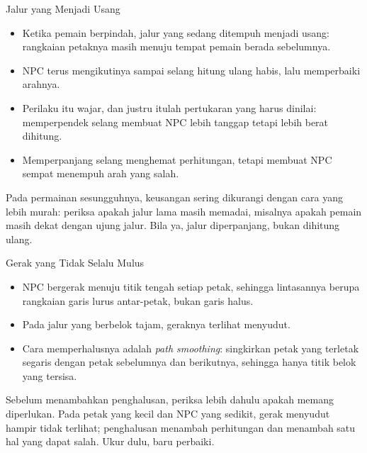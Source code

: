 \documentclass[aspectratio=169,10pt]{beamer}
\begin{document}
\begin{frame}{Jalur yang Menjadi Usang}
\begin{itemize}
  \item Ketika pemain berpindah, jalur yang sedang ditempuh menjadi usang:
        rangkaian petaknya masih menuju tempat pemain berada sebelumnya.
  \item NPC terus mengikutinya sampai selang hitung ulang habis, lalu
        memperbaiki arahnya.
  \item Perilaku itu wajar, dan justru itulah pertukaran yang harus dinilai:
        memperpendek selang membuat NPC lebih tanggap tetapi lebih berat
        dihitung.
  \item Memperpanjang selang menghemat perhitungan, tetapi membuat NPC sempat
        menempuh arah yang salah.
\end{itemize}
\vspace{0.1cm}
\begin{kotak}
Pada permainan sesungguhnya, keusangan sering dikurangi dengan cara yang lebih
murah: periksa apakah jalur lama masih memadai, misalnya apakah pemain masih
dekat dengan ujung jalur. Bila ya, jalur diperpanjang, bukan dihitung ulang.
\end{kotak}
\end{frame}

\begin{frame}{Gerak yang Tidak Selalu Mulus}
\begin{itemize}
  \item NPC bergerak menuju titik tengah setiap petak, sehingga lintasannya
        berupa rangkaian garis lurus antar-petak, bukan garis halus.
  \item Pada jalur yang berbelok tajam, geraknya terlihat menyudut.
  \item Cara memperhalusnya adalah \emph{path smoothing}: singkirkan petak yang
        terletak segaris dengan petak sebelumnya dan berikutnya, sehingga hanya
        titik belok yang tersisa.
\end{itemize}
\vspace{0.12cm}
\begin{kiat}
Sebelum menambahkan penghalusan, periksa lebih dahulu apakah memang diperlukan.
Pada petak yang kecil dan NPC yang sedikit, gerak menyudut hampir tidak
terlihat; penghalusan menambah perhitungan dan menambah satu hal yang dapat
salah. Ukur dulu, baru perbaiki.
\end{kiat}
\end{frame}
\end{document}
